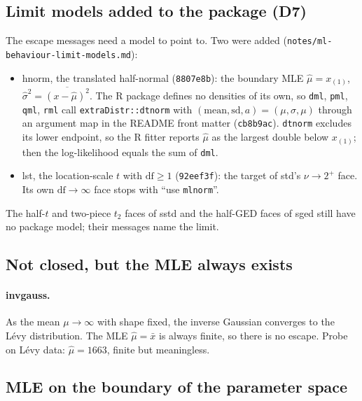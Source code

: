 \documentclass[11pt]{article}
\newcommand{\code}[1]{\texttt{#1}}
\theoremstyle{plain}
\theoremstyle{definition}
\theoremstyle{remark}
\begin{document}
\subsection{Limit models added to the package (D7)}

The escape messages need a model to point to. Two were added
(\code{notes/ml-behaviour-limit-models.md}):
\begin{itemize}
  \item hnorm, the translated half-normal (\code{8807e8b}): the boundary MLE
    $\hat\mu = x_{(1)}$, $\hat\sigma^2 = \overline{(x-\hat\mu)^2}$. The R
    package defines no densities of its own, so \code{dml}, \code{pml},
    \code{qml}, \code{rml} call \code{extraDistr::dtnorm} with
    $(\text{mean}, \text{sd}, a) = (\mu, \sigma, \mu)$ through an argument
    map in the README front matter (\code{cb8b9ac}). \code{dtnorm} excludes
    its lower endpoint, so the R fitter reports $\hat\mu$ as the largest
    double below $x_{(1)}$; then the log-likelihood equals the sum of
    \code{dml}.
  \item lst, the location-scale $t$ with $\mathrm{df} \ge 1$
    (\code{92eef3f}): the target of std's $\nu\to2^+$ face. Its own
    $\mathrm{df}\to\infty$ face stops with ``use \code{mlnorm}''.
\end{itemize}
The half-$t$ and two-piece $t_2$ faces of sstd and the half-GED faces of
sged still have no package model; their messages name the limit.

\subsection{Not closed, but the MLE always exists}\label{sec:exists}

\paragraph{invgauss.} As the mean $\mu\to\infty$ with shape fixed, the
inverse Gaussian converges to the L\'evy distribution. The MLE
$\hat\mu = \bar x$ is always finite, so there is no escape. Probe on L\'evy
data: $\hat\mu = 1663$, finite but meaningless.

\subsection{MLE on the boundary of the parameter space}
\end{document}
